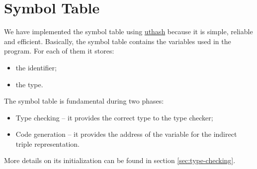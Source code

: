 \section{Symbol Table}
We have implemented the symbol table using
\href{https://troydhanson.github.io/uthash/}{uthash} because it is simple,
reliable and efficient. Basically, the symbol table contains the variables used
in the program. For each of them it stores:
\begin{itemize}
	\item the identifier;
	\item the type.
\end{itemize}

The symbol table is fundamental during two phases:
\begin{itemize}
	\item Type checking -- it provides the correct type to the type checker;
	\item Code generation -- it provides the address of the variable for the
	indirect triple representation.
\end{itemize}
More details on its initialization can be found in section
\ref{sec:type-checking}.
